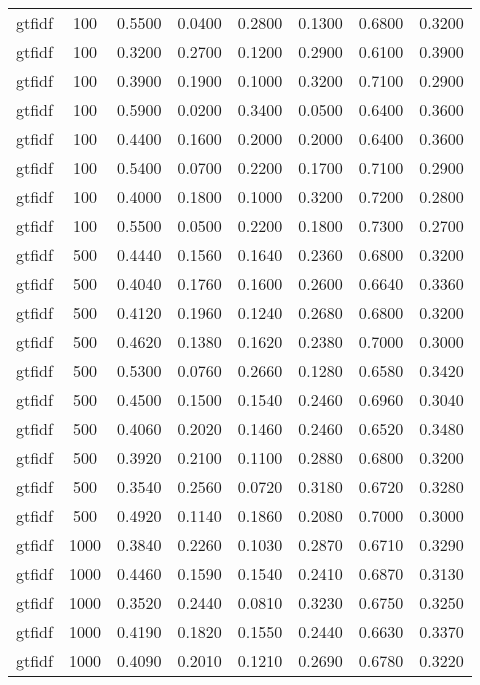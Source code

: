 \begin{scriptsize}
\begin{longtable}{cccccccc}
		gtfidf   & 100  & 0.5500 & 0.0400 & 0.2800 & 0.1300 & 0.6800 & 0.3200 \\
		gtfidf   & 100  & 0.3200 & 0.2700 & 0.1200 & 0.2900 & 0.6100 & 0.3900 \\
		gtfidf   & 100  & 0.3900 & 0.1900 & 0.1000 & 0.3200 & 0.7100 & 0.2900 \\
		gtfidf   & 100  & 0.5900 & 0.0200 & 0.3400 & 0.0500 & 0.6400 & 0.3600 \\
		gtfidf   & 100  & 0.4400 & 0.1600 & 0.2000 & 0.2000 & 0.6400 & 0.3600 \\
		gtfidf   & 100  & 0.5400 & 0.0700 & 0.2200 & 0.1700 & 0.7100 & 0.2900 \\
		gtfidf   & 100  & 0.4000 & 0.1800 & 0.1000 & 0.3200 & 0.7200 & 0.2800 \\
		gtfidf   & 100  & 0.5500 & 0.0500 & 0.2200 & 0.1800 & 0.7300 & 0.2700 \\
		gtfidf   & 500  & 0.4440 & 0.1560 & 0.1640 & 0.2360 & 0.6800 & 0.3200 \\
		gtfidf   & 500  & 0.4040 & 0.1760 & 0.1600 & 0.2600 & 0.6640 & 0.3360 \\
		gtfidf   & 500  & 0.4120 & 0.1960 & 0.1240 & 0.2680 & 0.6800 & 0.3200 \\
		gtfidf   & 500  & 0.4620 & 0.1380 & 0.1620 & 0.2380 & 0.7000 & 0.3000 \\
		gtfidf   & 500  & 0.5300 & 0.0760 & 0.2660 & 0.1280 & 0.6580 & 0.3420 \\
		gtfidf   & 500  & 0.4500 & 0.1500 & 0.1540 & 0.2460 & 0.6960 & 0.3040 \\
		gtfidf   & 500  & 0.4060 & 0.2020 & 0.1460 & 0.2460 & 0.6520 & 0.3480 \\
		gtfidf   & 500  & 0.3920 & 0.2100 & 0.1100 & 0.2880 & 0.6800 & 0.3200 \\
		gtfidf   & 500  & 0.3540 & 0.2560 & 0.0720 & 0.3180 & 0.6720 & 0.3280 \\
		gtfidf   & 500  & 0.4920 & 0.1140 & 0.1860 & 0.2080 & 0.7000 & 0.3000 \\
		gtfidf   & 1000 & 0.3840 & 0.2260 & 0.1030 & 0.2870 & 0.6710 & 0.3290 \\
		gtfidf   & 1000 & 0.4460 & 0.1590 & 0.1540 & 0.2410 & 0.6870 & 0.3130 \\
		gtfidf   & 1000 & 0.3520 & 0.2440 & 0.0810 & 0.3230 & 0.6750 & 0.3250 \\
		gtfidf   & 1000 & 0.4190 & 0.1820 & 0.1550 & 0.2440 & 0.6630 & 0.3370 \\
		gtfidf   & 1000 & 0.4090 & 0.2010 & 0.1210 & 0.2690 & 0.6780 & 0.3220 \\

\end{longtable}
\end{scriptsize}
